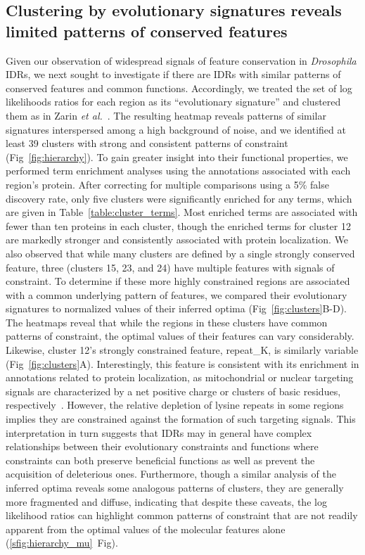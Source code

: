 \subsection{Clustering by evolutionary signatures reveals limited patterns of conserved features}
Given our observation of widespread signals of feature conservation in \textit{Drosophila} IDRs, we next sought to investigate if there are IDRs with similar patterns of conserved features and common functions. Accordingly, we treated the set of log likelihoods ratios for each region as its ``evolutionary signature'' and clustered them as in Zarin \textit{et al.}~\cite{Zarin2019}. The resulting heatmap reveals patterns of similar signatures interspersed among a high background of noise, and we identified at least 39 clusters with strong and consistent patterns of constraint (Fig~\ref{fig:hierarchy}). To gain greater insight into their functional properties, we performed term enrichment analyses using the annotations associated with each region's protein. After correcting for multiple comparisons using a 5\% false discovery rate, only five clusters were significantly enriched for any terms, which are given in Table~\ref{table:cluster_terms}. Most enriched terms are associated with fewer than ten proteins in each cluster, though the enriched terms for cluster 12 are markedly stronger and consistently associated with protein localization. We also observed that while many clusters are defined by a single strongly conserved feature, three (clusters 15, 23, and 24) have multiple features with signals of constraint. To determine if these more highly constrained regions are associated with a common underlying pattern of features, we compared their evolutionary signatures to normalized values of their inferred optima (Fig~\ref{fig:clusters}B-D). The heatmaps reveal that while the regions in these clusters have common patterns of constraint, the optimal values of their features can vary considerably. Likewise, cluster 12's strongly constrained feature, repeat\_K, is similarly variable (Fig~\ref{fig:clusters}A). Interestingly, this feature is consistent with its enrichment in annotations related to protein localization, as mitochondrial or nuclear targeting signals are characterized by a net positive charge or clusters of basic residues, respectively~\cite{Moulin2019, Lu2021}. However, the relative depletion of lysine repeats in some regions implies they are constrained against the formation of such targeting signals. This interpretation in turn suggests that IDRs may in general have complex relationships between their evolutionary constraints and functions where constraints can both preserve beneficial functions as well as prevent the acquisition of deleterious ones. Furthermore, though a similar analysis of the inferred optima reveals some analogous patterns of clusters, they are generally more fragmented and diffuse, indicating that despite these caveats, the log likelihood ratios can highlight common patterns of constraint that are not readily apparent from the optimal values of the molecular features alone (\ref{sfig:hierarchy_mu}~Fig).

